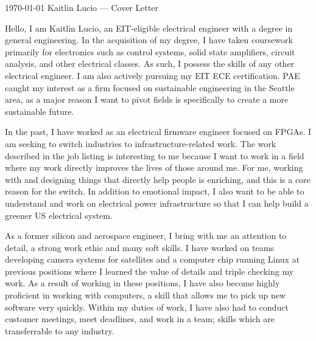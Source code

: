 \documentclass[11pt, a4paper]{awesome-cv}
\begin{document}
\makecvheader[R]

\makecvfooter
  {\today}
  {Kaitlin Lucio --- Cover Letter}
  {}

\makelettertitle

\begin{cvletter}

  \tab Hello, I am Kaitlin Lucio, an EIT-eligible electrical engineer with a degree in general engineering.
  In the acquisition of my degree, I have taken coursework primarily for electronics such as control systems,
  solid state amplifiers, circuit analysis, and other electrical classes.
  As such, I possess the skills of any other electrical engineer.
  I am also actively pursuing my EIT ECE certification.
  PAE caught my interest as a firm focused on sustainable engineering in the
  Seattle area, as a major reason I want to pivot fields is specifically to create a more sustainable future.
  
  \tab In the past, I have worked as an electrical firmware engineer focused on FPGAs.
  I am seeking to switch industries to infrastructure-related work.
  The work described in the job listing is interesting to me because I want to work in a field
  where my work directly improves the lives of those around me.
  For me, working with and designing things that directly help people is enriching, and this
  is a core reason for the switch.
  In addition to emotional impact, I also want to be able to understand and work on electrical power infrastructure so that
  I can help build a greener US electrical system.

  \tab As a former silicon and aerospace engineer, I bring with me an attention to detail, a strong work ethic and
  many soft skills.
  I have worked on teams developing camera systems for satellites and a computer chip running Linux at previous
  positions where I learned the value of details and triple checking my work.
  As a result of working in these positions, I have also become highly proficient in working with
  computers, a skill that allows me to pick up new software very quickly.
  Within my duties of work, I have also had to
  conduct customer meetings, meet deadlines, and work in a team; skills which are transferrable to any industry.
  

\end{cvletter}
\end{document}
